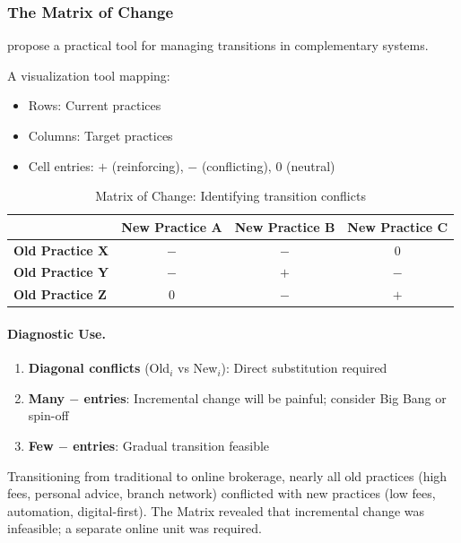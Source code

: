 \subsubsection{The Matrix of Change}

\citet{brynjolfsson2013complementarities} propose a practical tool for managing 
transitions in complementary systems.

\begin{definition}
\label{def:matrix-change}
A visualization tool mapping:
\begin{itemize}
    \item Rows: Current practices
    \item Columns: Target practices
    \item Cell entries: $+$ (reinforcing), $-$ (conflicting), $0$ (neutral)
\end{itemize}
\end{definition}

\begin{table}[h]
\centering
\small
\begin{tabular}{l|ccc}
\toprule
& \textbf{New Practice A} & \textbf{New Practice B} & \textbf{New Practice C} \\
\midrule
\textbf{Old Practice X} & $-$ & $-$ & $0$ \\
\textbf{Old Practice Y} & $-$ & $+$ & $-$ \\
\textbf{Old Practice Z} & $0$ & $-$ & $+$ \\
\bottomrule
\end{tabular}
\caption{Matrix of Change: Identifying transition conflicts}
\label{tab:matrix-change}
\end{table}

\paragraph{Diagnostic Use.}

\begin{enumerate}
    \item \textbf{Diagonal conflicts} (Old$_i$ vs New$_i$): Direct substitution required
    \item \textbf{Many $-$ entries}: Incremental change will be painful; consider 
    Big Bang or spin-off
    \item \textbf{Few $-$ entries}: Gradual transition feasible
\end{enumerate}

\begin{example}
Transitioning from traditional to online brokerage, nearly all old practices 
(high fees, personal advice, branch network) conflicted with new practices 
(low fees, automation, digital-first). The Matrix revealed that incremental 
change was infeasible; a separate online unit was required.
\end{example}

